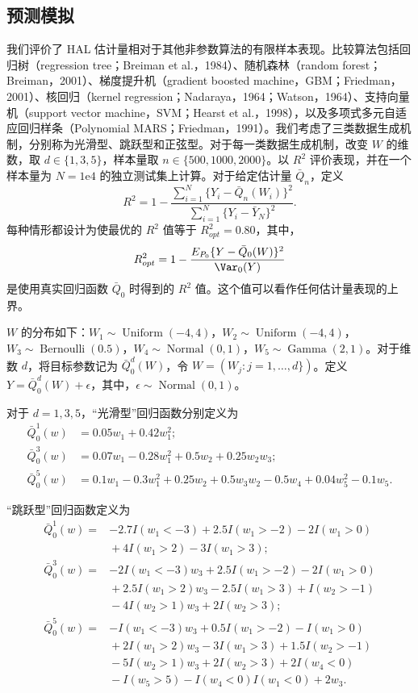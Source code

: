 \subsection{预测模拟}
\label{subsec:ch06-prediction-simulation}

我们评价了 HAL 估计量相对于其他非参数算法的有限样本表现。比较算法包括回归树（regression tree；Breiman et al.，1984）、随机森林（random forest；Breiman，2001）、梯度提升机（gradient boosted machine，GBM；Friedman，2001）、核回归（kernel regression；Nadaraya，1964；Watson，1964）、支持向量机（support vector machine，SVM；Hearst et al.，1998），以及多项式多元自适应回归样条（Polynomial MARS；Friedman，1991）。我们考虑了三类数据生成机制，分别称为光滑型、跳跃型和正弦型。对于每一类数据生成机制，改变 $W$ 的维数，取 $d\in\{1,3,5\}$，样本量取 $n\in\{500,1000,2000\}$。以 $R^2$ 评价表现，并在一个样本量为 $N=1\mathrm e4$ 的独立测试集上计算。对于给定估计量 $\bar Q_n$，定义
\[
 R^2=1-\frac{\sum_{i=1}^N\{Y_i-\bar Q_n(W_i)\}^2}
                  {\sum_{i=1}^N\{Y_i-\bar Y_N\}^2}.
\]
每种情形都设计为使最优的 $R^2$ 值等于 $R^2_{opt}=0.80$，其中，
\[
 R^2_{opt}=1-\frac{E_{P_0}\{Y-\bar Q_0(W)\}^2}{\Var_0(Y)}
\]
是使用真实回归函数 $\bar Q_0$ 时得到的 $R^2$ 值。这个值可以看作任何估计量表现的上界。

$W$ 的分布如下：$W_1\sim\operatorname{Uniform}(-4,4)$，$W_2\sim\operatorname{Uniform}(-4,4)$，$W_3\sim\operatorname{Bernoulli}(0.5)$，$W_4\sim\operatorname{Normal}(0,1)$，$W_5\sim\operatorname{Gamma}(2,1)$。对于维数 $d$，将目标参数记为 $\bar Q_0^d(W)$，令 $W=(W_j:j=1,\ldots,d\})$。定义 $Y=\bar Q_0^d(W)+\epsilon$，其中，$\epsilon\sim\operatorname{Normal}(0,1)$。

对于 $d=1,3,5$，“光滑型”回归函数分别定义为
\[
 \begin{aligned}
 \bar Q_0^1(w)&=0.05w_1+0.42w_1^2;\\
 \bar Q_0^3(w)&=0.07w_1-0.28w_1^2+0.5w_2+0.25w_2w_3;\\
 \bar Q_0^5(w)&=0.1w_1-0.3w_1^2+0.25w_2+0.5w_3w_2
                         -0.5w_4+0.04w_5^2-0.1w_5.
 \end{aligned}
\]

“跳跃型”回归函数定义为
\[
 \begin{aligned}
 \bar Q_0^1(w)={}&-2.7I(w_1<-3)+2.5I(w_1>-2)-2I(w_1>0)\\
                &{}+4I(w_1>2)-3I(w_1>3);\\[.4em]
 \bar Q_0^3(w)={}&-2I(w_1<-3)w_3+2.5I(w_1>-2)-2I(w_1>0)\\
                &{}+2.5I(w_1>2)w_3-2.5I(w_1>3)+I(w_2>-1)\\
                &{}-4I(w_2>1)w_3+2I(w_2>3);\\[.4em]
 \bar Q_0^5(w)={}&-I(w_1<-3)w_3+0.5I(w_1>-2)-I(w_1>0)\\
                &{}+2I(w_1>2)w_3-3I(w_1>3)+1.5I(w_2>-1)\\
                &{}-5I(w_2>1)w_3+2I(w_2>3)+2I(w_4<0)\\
                &{}-I(w_5>5)-I(w_4<0)I(w_1<0)+2w_3.
 \end{aligned}
\]

